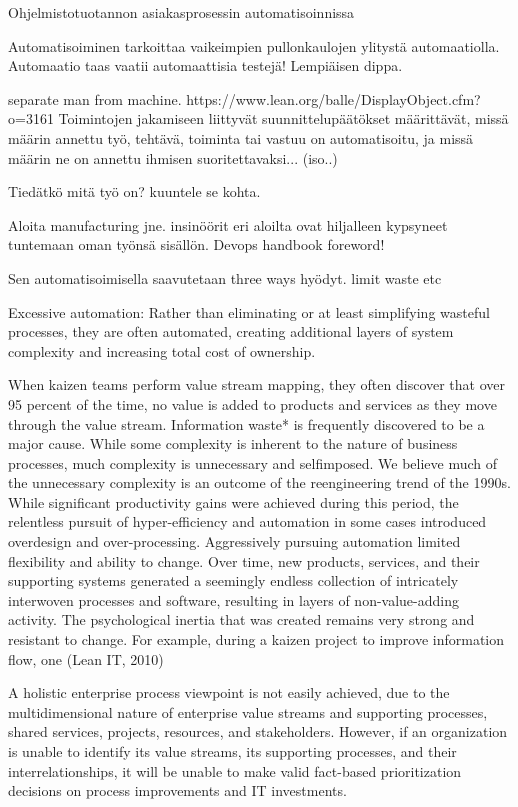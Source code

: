 \documentclass[finnish,12pt,a4paper,pdftex]{article}
\begin{document}
Ohjelmistotuotannon asiakasprosessin automatisoinnissa 

Automatisoiminen tarkoittaa vaikeimpien pullonkaulojen ylitystä automaatiolla. Automaatio taas vaatii automaattisia testejä! Lempiäisen dippa.

separate man from machine. https://www.lean.org/balle/DisplayObject.cfm?o=3161 
Toimintojen jakamiseen liittyvät suunnittelupäätökset määrittävät, missä määrin annettu työ, tehtävä, toiminta tai vastuu on automatisoitu, ja missä määrin ne on annettu ihmisen suoritettavaksi... (iso..)

Tiedätkö mitä työ on? kuuntele se kohta.

Aloita manufacturing jne. 
insinöörit eri aloilta ovat hiljalleen kypsyneet tuntemaan oman työnsä sisällön. Devops handbook foreword!

Sen automatisoimisella saavutetaan three ways hyödyt. limit waste etc

Excessive automation: Rather than eliminating or at least simplifying
wasteful processes, they are often automated, creating additional
layers of system complexity and increasing total cost of ownership.




When kaizen teams perform value stream mapping, they often discover
that over 95 percent of the time, no value is added to products and services
as they move through the value stream. Information waste* is frequently
discovered to be a major cause. While some complexity is inherent to the
nature of business processes, much complexity is unnecessary and selfimposed.
We believe much of the unnecessary complexity is an outcome of
the reengineering trend of the 1990s. While significant productivity gains
were achieved during this period, the relentless pursuit of hyper-efficiency
and automation in some cases introduced overdesign and over-processing.
Aggressively pursuing automation limited flexibility and ability to change.
Over time, new products, services, and their supporting systems generated
a seemingly endless collection of intricately interwoven processes and
software, resulting in layers of non-value-adding activity. The psychological
inertia that was created remains very strong and resistant to change.
For example, during a kaizen project to improve information flow, one (Lean IT, 2010)

A holistic enterprise process viewpoint is not easily achieved, due to
the multidimensional nature of enterprise value streams and supporting
processes, shared services, projects, resources, and stakeholders.
However, if an organization is unable to identify its value streams, its
supporting processes, and their interrelationships, it will be unable to
make valid fact-based prioritization decisions on process improvements
and IT investments. 
\end{document}
